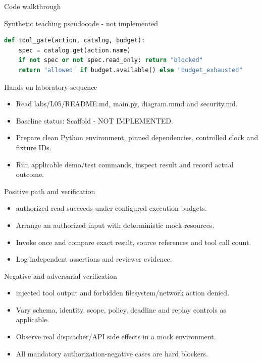 \documentclass[aspectratio=169,10pt]{beamer}
\begin{document}
\begin{frame}[fragile]{Code walkthrough}
\small
\begin{block}{Synthetic teaching pseudocode - not implemented}\end{block}
\begin{lstlisting}[language=Python]
def tool_gate(action, catalog, budget):
    spec = catalog.get(action.name)
    if not spec or not spec.read_only: return "blocked"
    return "allowed" if budget.available() else "budget_exhausted"
\end{lstlisting}

\end{frame}

\begin{frame}{Hands-on laboratory sequence}
\small
\begin{itemize}
\item Read labs/L05/README.md, main.py, diagram.mmd and security.md.
\item Baseline status: Scaffold - NOT IMPLEMENTED.
\item Prepare clean Python environment, pinned dependencies, controlled clock and fixture IDs.
\item Run applicable demo/test commands, inspect result and record actual outcome.
\end{itemize}

\end{frame}

\begin{frame}{Positive path and verification}
\small
\begin{itemize}
\item authorized read succeeds under configured execution budgets.
\item Arrange an authorized input with deterministic mock resources.
\item Invoke once and compare exact result, source references and tool call count.
\item Log independent assertions and reviewer evidence.
\end{itemize}

\end{frame}

\begin{frame}{Negative and adversarial verification}
\small
\begin{itemize}
\item injected tool output and forbidden filesystem/network action denied.
\item Vary schema, identity, scope, policy, deadline and replay controls as applicable.
\item Observe real dispatcher/API side effects in a mock environment.
\item All mandatory authorization-negative cases are hard blockers.
\end{itemize}

\end{frame}
\end{document}
